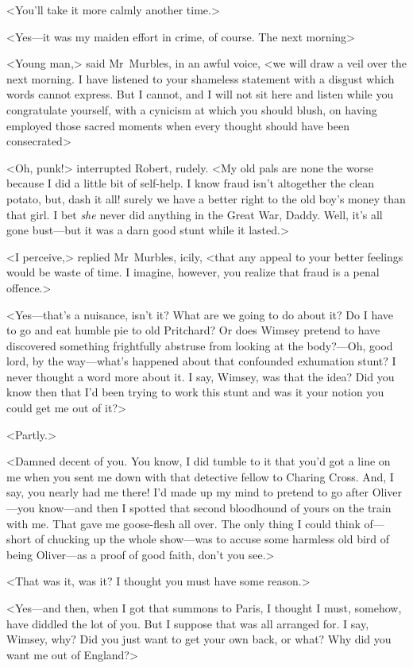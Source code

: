 <You'll take it more calmly another time.>

<Yes—it was my maiden effort in crime, of course. The next morning\longdash>

<Young man,> said Mr~Murbles, in an awful voice, <we will draw a veil over the next morning. I have listened to your shameless statement with a disgust which words cannot express. But I cannot, and I will not sit here and listen while you congratulate yourself, with a cynicism at which you should blush, on having employed those sacred moments when every thought should have been consecrated\longdash>

<Oh, punk!> interrupted Robert, rudely. <My old pals are none the worse because I did a little bit of self-help. I know fraud isn't altogether the clean potato, but, dash it all! surely we have a better right to the old boy's money than that girl. I bet \emph{she} never did anything in the Great War, Daddy. Well, it's all gone bust—but it was a darn good stunt while it lasted.>

<I perceive,> replied Mr~Murbles, icily, <that any appeal to your better feelings would be waste of time. I imagine, however, you realize that fraud is a penal offence.>

<Yes—that's a nuisance, isn't it? What are we going to do about it? Do I have to go and eat humble pie to old Pritchard? Or does Wimsey pretend to have discovered something frightfully abstruse from looking at the body?—Oh, good lord, by the way—what's happened about that confounded exhumation stunt? I never thought a word more about it. I say, Wimsey, was that the idea? Did you know then that I'd been trying to work this stunt and was it your notion you could get me out of it?>

<Partly.>

<Damned decent of you. You know, I did tumble to it that you'd got a line on me when you sent me down with that detective fellow to Charing Cross. And, I say, you nearly had me there! I'd made up my mind to pretend to go after Oliver—you know—and then I spotted that second bloodhound of yours on the train with me. That gave me goose-flesh all over. The only thing I could think of—short of chucking up the whole show—was to accuse some harmless old bird of being Oliver—as a proof of good faith, don't you see.>

<That was it, was it? I thought you must have some reason.>

<Yes—and then, when I got that summons to Paris, I thought I must, somehow, have diddled the lot of you. But I suppose that was all arranged for. I say, Wimsey, why? Did you just want to get your own back, or what? Why did you want me out of England?>

